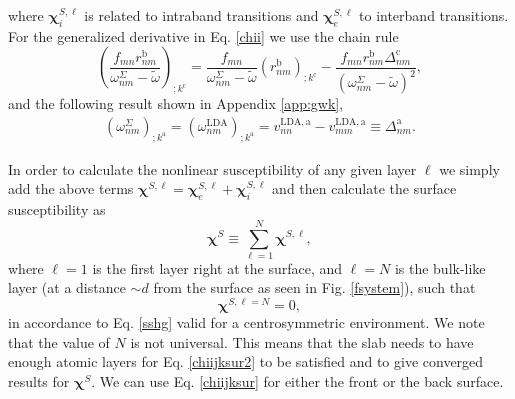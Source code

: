 where $\boldsymbol{\chi}^{S,\ell}_i$
 is related to intraband transitions and
$\boldsymbol{\chi}^{S,\ell}_e$
to interband transitions.
For the generalized derivative in Eq. \eqref{chii} we use the chain rule 
\begin{equation}\label{gene2}
\left(\frac{f_{mn}r_{nm}^{\mathrm{b}}}{\omega^\Sigma_{nm}-\tilde{\omega}}\right)_{;k^{\mathrm{c}}}=
\frac{f_{mn}}{\omega^\Sigma_{nm}-\tilde{\omega}}\left(r_{nm}^{\mathrm{b}}\right)_{;k^{\mathrm{c}}}
-\frac{f_{mn}r_{nm}^{\mathrm{b}}\Delta_{nm}^\mathrm{c}}{(\omega^\Sigma_{nm}-\tilde{\omega})^2}
,
\end{equation}
and the following result
shown in Appendix \ref{app:gwk},
\begin{align}\label{eli.13}
\left(\omega^\Sigma_{nm}\right)_{;k^{\mathrm{a}}}
=
\left(\omega^{\mathrm{LDA}}_{nm}\right)_{;k^{\mathrm{a}}}
= 
v_{nn}^{\mathrm{LDA},\mathrm{a}}-v_{mm}^{\mathrm{LDA},\mathrm{a}}\equiv\Delta_{nm}^{\mathrm{a}}
.
\end{align} 

In order to calculate the nonlinear susceptibility of any given layer 
$\ell$ we simply add the above terms $\boldsymbol{\chi}^{S,\ell}=
\boldsymbol{\chi}_e^{S,\ell}+\boldsymbol{\chi}_i^{S,\ell}$ and 
then calculate the surface susceptibility as 
\begin{equation}\label{chiijksur}
\boldsymbol{\chi}^S\equiv \sum_{\ell=1}^{N}\boldsymbol{\chi}^{S,\ell},
\end{equation} 
where $\ell=1$ is the first layer right at the surface, 
and $\ell=N$ is the bulk-like layer (at a distance $\sim d$ from the
surface  as seen in
Fig. \ref{fsystem}), such that 
\begin{equation}\label{chiijksur2}
\boldsymbol{\chi}^{S,\ell=N}=0,
\end{equation}
in accordance to Eq. \eqref{sshg} valid for a centrosymmetric environment. 
We note that the value of
$N$ is not universal.
This means that the slab needs to have enough atomic layers for 
Eq. \eqref{chiijksur2} 
to be satisfied and to give converged results for $\boldsymbol{\chi}^S$. 
We can use Eq. \eqref{chiijksur} for
either the front or the back surface.

